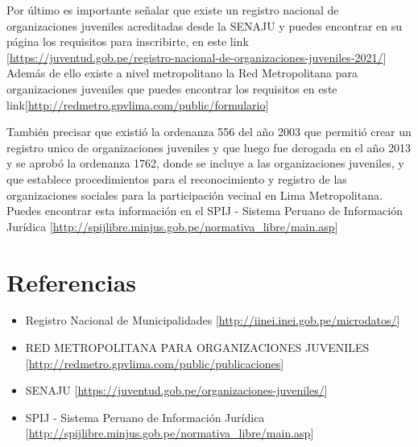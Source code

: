 \documentclass[
]{book}
\providecommand{\tightlist}{%
  \setlength{\itemsep}{0pt}\setlength{\parskip}{0pt}}
\begin{document}
Por último es importante señalar que existe un registro nacional de organizaciones juveniles acreditadas desde la SENAJU y puedes encontrar en su página los requisitos para inscribirte, en este link {[}\url{https://juventud.gob.pe/registro-nacional-de-organizaciones-juveniles-2021/}{]} Además de ello existe a nivel metropolitano la Red Metropolitana para organizaciones juveniles que puedes encontrar los requisitos en este link{[}\url{http://redmetro.gpvlima.com/public/formulario}{]}

También precisar que existió la ordenanza 556 del año 2003 que permitió crear un registro unico de organizaciones juveniles y que luego fue derogada en el año 2013 y se aprobó la ordenanza 1762, donde se incluye a las organizaciones juveniles, y que establece procedimientos para el reconocimiento y registro de las organizaciones sociales para la participación vecinal en Lima Metropolitana. Puedes encontrar esta información en el SPIJ - Sistema Peruano de Información Jurídica {[}\url{http://spijlibre.minjus.gob.pe/normativa_libre/main.asp}{]}

\hypertarget{referencias-2}{%
\section{Referencias}\label{referencias-2}}

\begin{itemize}
\tightlist
\item
  Registro Nacional de Municipalidades {[}\url{http://iinei.inei.gob.pe/microdatos/}{]}
\item
  RED METROPOLITANA PARA ORGANIZACIONES JUVENILES {[}\url{http://redmetro.gpvlima.com/public/publicaciones}{]}
\item
  SENAJU {[}\url{https://juventud.gob.pe/organizaciones-juveniles/}{]}
\item
  SPIJ - Sistema Peruano de Información Jurídica {[}\url{http://spijlibre.minjus.gob.pe/normativa_libre/main.asp}{]}
\end{itemize}
\end{document}
